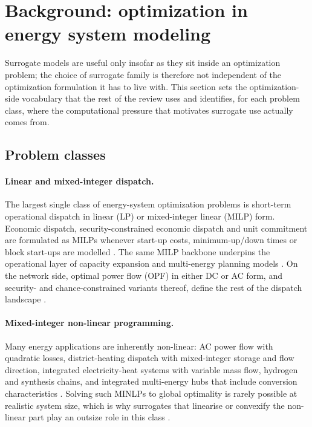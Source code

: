 \section{Background: optimization in energy system modeling}
\label{sec:background}

Surrogate models are useful only insofar as they sit inside an
optimization problem; the choice of surrogate family is therefore not
independent of the optimization formulation it has to live with. This
section sets the optimization-side vocabulary that the rest of the
review uses and identifies, for each problem class, where the
computational pressure that motivates surrogate use actually comes
from.


\subsection{Problem classes}
\label{sec:background:problem-classes}

\paragraph{Linear and mixed-integer dispatch.}
The largest single class of energy-system optimization problems is
short-term operational dispatch in linear (LP) or mixed-integer linear
(MILP) form. Economic dispatch, security-constrained economic dispatch
and unit commitment are formulated as MILPs whenever start-up costs,
minimum-up/down times or block start-ups are modelled
\cite{Wu2022231,Chen20244723,Chen2022,Lu20232989,Safta20172535,Pang2023,Wang20211767,Lin2023,Dullinger20181646,Nikolaidis2021}.
The same MILP backbone underpins the operational layer of capacity
expansion and multi-energy planning models
\cite{Rodgers2018951,Jahangiri20244849,Jahangiri2023,Han2018622,Fu20202904,Fu2022,Cao2023,Yin2024,Wang2020202933,Ren2024}.
On the network side, optimal power flow (OPF) in either DC or AC
form, and security- and chance-constrained variants thereof, define
the rest of the dispatch landscape
\cite{Muhlpfordt20194806,Su2022315,Deng2020831,Liu20223726,Chen2023657,Koirala20242284,Xu20212696,Srithapon202134395,Urgun20202791,Khaloie2025}.

\paragraph{Mixed-integer non-linear programming.}
Many energy applications are inherently non-linear: AC power flow
with quadratic losses, district-heating dispatch with mixed-integer
storage and flow direction, integrated electricity-heat systems with
variable mass flow, hydrogen and synthesis chains, and integrated
multi-energy hubs that include conversion characteristics
\cite{Zheng20231907,Wu2021,Cao2023,Yin2024,Ren2024,Jalving2023,Dong2023,Wang2020202933}.
Solving such MINLPs to global optimality is rarely possible at
realistic system size, which is why surrogates that linearise or
convexify the non-linear part play an outsize role in this class
\cite{Liu20223726,Chen2023657,Su2022315,Deng2020831,Park2019}.

